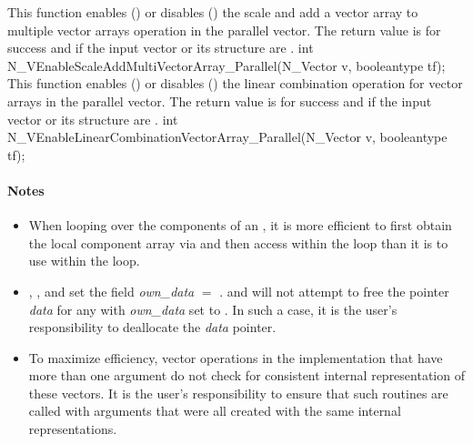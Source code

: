 {
  This function enables () or disables () the scale and
  add a vector array to multiple vector arrays operation in the parallel vector. The
  return value is  for success and  if the input vector or its
   structure are .
}
{
  int N\_VEnableScaleAddMultiVectorArray\_Parallel(N\_Vector v,
  booleantype tf);
}
{
  This function enables () or disables () the linear
  combination operation for vector arrays in the parallel vector. The return value
  is  for success and  if the input vector or its  structure
  are .
}
{
  int N\_VEnableLinearCombinationVectorArray\_Parallel(N\_Vector v,
  booleantype tf);
}
\paragraph{\bf Notes} 
           
\begin{itemize}
                                        
\item
  When looping over the components of an  , it is     
  more efficient to first obtain the local component array via       
   and then access  within the     
  loop than it is to use  within the loop.        
                                                               
\item
  {\warn}, , 
  and  set the field 
  {\em own\_data} $=$ . 
   and 
  will not attempt to free the pointer {\em data} for any  with
  {\em own\_data} set to . In such a case, it is the user's responsibility to
  deallocate the {\em data} pointer.

\item
  {\warn}To maximize efficiency, vector operations in the {\nvecp} implementation
  that have more than one  argument do not check for
  consistent internal representation of these vectors. It is the user's 
  responsibility to ensure that such routines are called with 
  arguments that were all created with the same internal representations.

\end{itemize}


